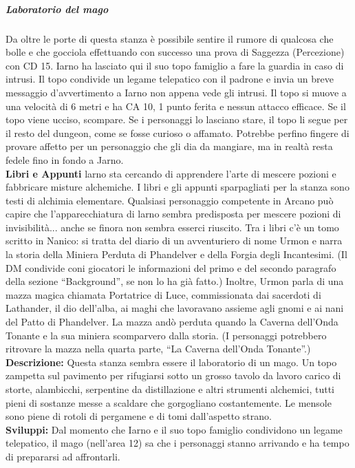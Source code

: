 \documentclass{article}
\begin{document}
        \subparagraph{Laboratorio del mago} Da oltre le porte di questa stanza è possibile sentire il rumore
di qualcosa che bolle e che gocciola effettuando con successo
una prova di Saggezza (Percezione) con CD 15. Iarno ha lasciato qui il suo topo famiglio a fare la guardia in
caso di intrusi. Il topo condivide un legame telepatico con il
padrone e invia un breve messaggio d’avvertimento a Iarno
non appena vede gli intrusi. Il topo si muove a una velocità di
6 metri e ha CA 10, 1 punto ferita e nessun attacco efficace.
Se il topo viene ucciso, scompare.
Se i personaggi lo lasciano stare, il topo li segue per il resto
del dungeon, come se fosse curioso o affamato. Potrebbe
perfino fingere di provare affetto per un personaggio
che gli dia da mangiare, ma in realtà resta fedele fino in
fondo a Jarno. \\
\textbf{Libri e Appunti} larno sta cercando di apprendere l’arte
di mescere pozioni e fabbricare misture alchemiche. I libri e
gli appunti sparpagliati per la stanza sono testi di alchimia
elementare. Qualsiasi personaggio competente in Arcano può
capire che l’apparecchiatura di larno sembra predisposta per
mescere pozioni di invisibilità... anche se finora non sembra
esserci riuscito.
Tra i libri c'è un tomo scritto in Nanico: si tratta del
diario di un avventuriero di nome Urmon e narra la
storia della Miniera Perduta di Phandelver e della Forgia
degli Incantesimi. (Il DM condivide coni giocatori le
informazioni del primo e del secondo paragrafo della
sezione “Background”, se non lo ha già fatto.) Inoltre, Urmon
parla di una mazza magica chiamata Portatrice di Luce,
commissionata dai sacerdoti di Lathander, il dio dell’alba, ai
maghi che lavoravano assieme agli gnomi e ai nani del Patto
di Phandelver. La mazza andò perduta quando la Caverna
dell’Onda Tonante e la sua miniera scomparvero dalla storia.
(I personaggi potrebbero ritrovare la mazza nella quarta
parte, “La Caverna dell’Onda Tonante”.)\\
\textbf{Descrizione:} Questa stanza sembra essere il laboratorio di un mago. Un
topo zampetta sul pavimento per rifugiarsi sotto un grosso
tavolo da lavoro carico di storte, alambicchi, serpentine da
distillazione e altri strumenti alchemici, tutti pieni di sostanze
messe a scaldare che gorgogliano costantemente. Le mensole
sono piene di rotoli di pergamene e di tomi dall’aspetto strano.\\
\textbf{Sviluppi:} Dal momento che Iarno e il suo topo famiglio condividono un
legame telepatico, il mago (nell’area 12) sa che i personaggi
stanno arrivando e ha tempo di prepararsi ad affrontarli.\\
\end{document}

